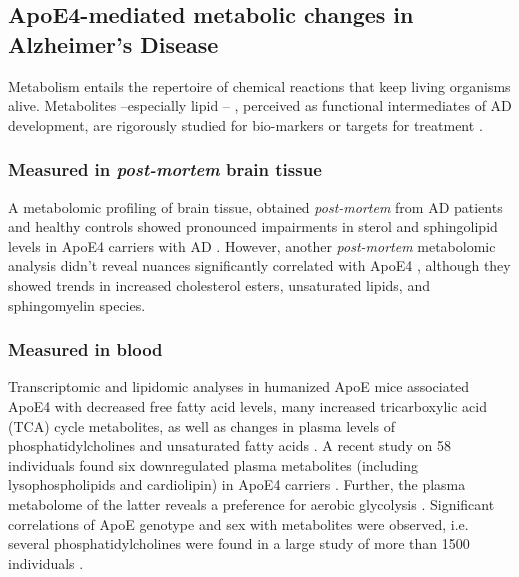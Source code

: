 \documentclass{amsart}
\begin{document}
\subsection{ApoE4-mediated metabolic changes in Alzheimer's Disease}
Metabolism entails the repertoire of chemical reactions that keep living organisms alive. Metabolites  --especially lipid \cite{Barupal2019SetsPathophysiology,Fernandez-Calle2022APOEDiseases, Proitsi2017AssociationAnalysis}-- , perceived as functional intermediates of AD development, are rigorously studied for bio-markers or targets for treatment \cite{Oeckl2019GlialImpairment}.
 
\subsubsection{Measured in \textit{post-mortem} brain tissue}A metabolomic profiling of brain tissue, obtained \textit{post-mortem} from AD patients and healthy controls showed  pronounced impairments in sterol and sphingolipid levels in ApoE4 carriers with AD  \cite{Bandaru2009ApoE4Brain}. However, another \textit{post-mortem} metabolomic analysis didn't reveal nuances significantly correlated with ApoE4 \cite{Novotny2023MetabolomicBrains}, although they showed trends in increased cholesterol esters, unsaturated lipids, and sphingomyelin species.

\subsubsection{Measured in blood}
Transcriptomic and lipidomic analyses in humanized ApoE mice associated ApoE4 with decreased free fatty acid levels, many increased  tricarboxylic acid (TCA) cycle metabolites, as well as changes in plasma levels of phosphatidylcholines and unsaturated fatty acids \cite{Area-Gomez2020APOE4Mice, Zhao2020AlzheimersPathways}. A recent study on 58 individuals found six downregulated plasma metabolites (including lysophospholipids and cardiolipin) in ApoE4 carriers \cite{pena-bautista2020MetabolomicsEffect}. Further, the plasma metabolome of the latter reveals a preference for aerobic glycolysis \cite{Farmer2021APO4Glycolysis}. Significant correlations of ApoE genotype and sex with metabolites were observed, i.e. several phosphatidylcholines were found in a large study of more than 1500 individuals \cite{Arnold2020SexMetabolome}.
\end{document}

